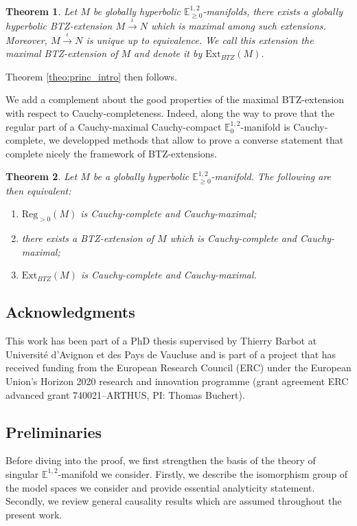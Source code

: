 \documentclass[a4paper,12pt]{article}
\newcommand{\mass}[1]{{\mathbb E}^{1,2}_{#1}}
\def\Reg{\mathrm{Reg}}
\def\BTZext{\mathrm{Ext}_{BTZ}}
\def\reg{\Reg}
\newtheorem{theo}{Theorem}    %
\begin{document}
 \begin{theo} Let $M$ be globally hyperbolic $\mass{\geq 0}$-manifolds, there exists a globally hyperbolic BTZ-extension $M\xrightarrow{\iota} N$ which is maximal among such extensions. Moreover, $M\xrightarrow{\iota}N$ is unique up to equivalence. We  call this extension
the maximal BTZ-extension of $M$ and denote it by 
  $\mathrm{Ext}_{BTZ}(M)$.   
\end{theo}
 Theorem \ref{theo:princ_intro} then follows. 

We add a complement about the good properties of the maximal BTZ-extension with respect to Cauchy-completeness. Indeed, along the way to prove that the regular part of a Cauchy-maximal Cauchy-compact $\mass{0}$-manifold is Cauchy-complete, we developped methods that allow to prove a converse statement that complete nicely the framework of BTZ-extensions. 

	\begin{theo} \label{theo:BTZ_Cauchy-completness_intro}
				Let $M$ be a globally hyperbolic $\mass{\geq0}$-manifold. The following are then equivalent:			
				\begin{enumerate}
				\item $\reg_{>0}(M)$ is Cauchy-complete and Cauchy-maximal;
				\item there exists a BTZ-extension of $M$ which is Cauchy-complete and Cau\-chy-maximal;
				\item $\BTZext(M)$ is Cauchy-complete and Cauchy-maxi\-mal.
				\end{enumerate}
				\end{theo}

\subsection{Acknowledgments}
This work has been part of a PhD thesis supervised by Thierry Barbot  at Université d'Avignon et des Pays de Vaucluse and is part of a project that has received funding from the European Research Council (ERC) under the European Union's Horizon 2020 research and innovation programme (grant agreement ERC advanced grant 740021--ARTHUS, PI: Thomas Buchert). 



\subsection{Preliminaries}
Before diving into the proof, we first strengthen the basis of the theory of singular $\mass{}$-manifold we consider. Firstly, we describe the isomorphism group of the model spaces we consider and provide essential analyticity statement. Secondly, we review general causality results which are assumed throughout the present work.
\end{document}
